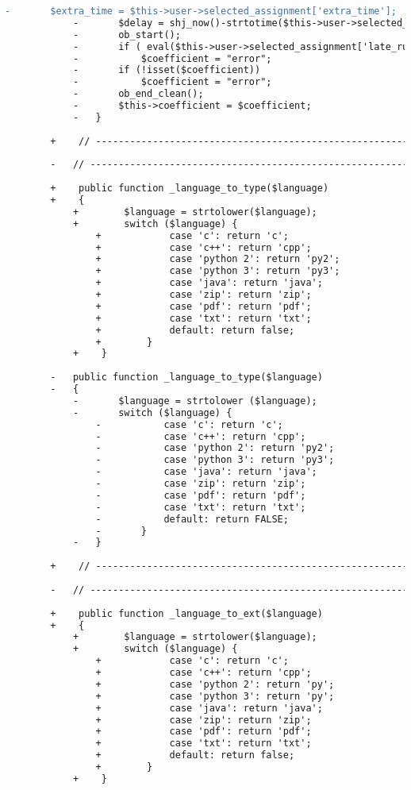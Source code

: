 \begin{lstlisting}[language=diff, caption=Perubahan pada kode Submit.php]
			-		$extra_time = $this->user->selected_assignment['extra_time'];
			-		$delay = shj_now()-strtotime($this->user->selected_assignment['finish_time']);;
			-		ob_start();
			-		if ( eval($this->user->selected_assignment['late_rule']) === FALSE )
			-			$coefficient = "error";
			-		if (!isset($coefficient))
			-			$coefficient = "error";
			-		ob_end_clean();
			-		$this->coefficient = $coefficient;
			-	}
		
		+    // ------------------------------------------------------------------------
		
		-	// ------------------------------------------------------------------------
		
		+    public function _language_to_type($language)
		+    {
			+        $language = strtolower($language);
			+        switch ($language) {
				+            case 'c': return 'c';
				+            case 'c++': return 'cpp';
				+            case 'python 2': return 'py2';
				+            case 'python 3': return 'py3';
				+            case 'java': return 'java';
				+            case 'zip': return 'zip';
				+            case 'pdf': return 'pdf';
				+            case 'txt': return 'txt';
				+            default: return false;
				+        }
			+    }
		
		-	public function _language_to_type($language)
		-	{
			-		$language = strtolower ($language);
			-		switch ($language) {
				-			case 'c': return 'c';
				-			case 'c++': return 'cpp';
				-			case 'python 2': return 'py2';
				-			case 'python 3': return 'py3';
				-			case 'java': return 'java';
				-			case 'zip': return 'zip';
				-			case 'pdf': return 'pdf';
				-			case 'txt': return 'txt';
				-			default: return FALSE;
				-		}
			-	}
		
		+    // ------------------------------------------------------------------------
		
		-	// ------------------------------------------------------------------------
		
		+    public function _language_to_ext($language)
		+    {
			+        $language = strtolower($language);
			+        switch ($language) {
				+            case 'c': return 'c';
				+            case 'c++': return 'cpp';
				+            case 'python 2': return 'py';
				+            case 'python 3': return 'py';
				+            case 'java': return 'java';
				+            case 'zip': return 'zip';
				+            case 'pdf': return 'pdf';
				+            case 'txt': return 'txt';
				+            default: return false;
				+        }
			+    }
		

\end{lstlisting}

